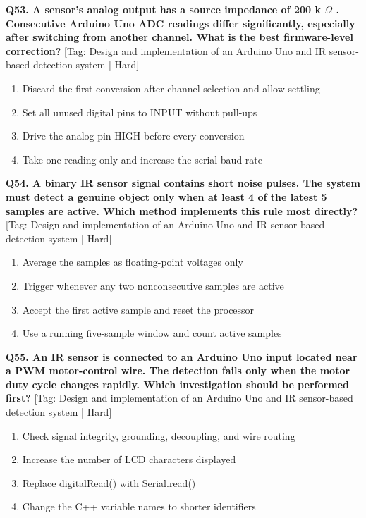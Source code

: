\noindent\textbf{Q53. A sensor's analog output has a source impedance of 200 k $\Omega$ . Consecutive Arduino Uno ADC readings differ significantly, especially after switching from another channel. What is the best firmware-level correction?} \hfill [Tag: Design and implementation of an Arduino Uno and IR sensor-based detection system | Hard]
\begin{enumerate}[label=(\alph*),topsep=2pt,itemsep=1pt,partopsep=0pt,parsep=0pt]
    \item {Discard the first conversion after channel selection and allow settling}
    \item {Set all unused digital pins to INPUT without pull-ups}
    \item {Drive the analog pin HIGH before every conversion}
    \item {Take one reading only and increase the serial baud rate}
\end{enumerate}
\vspace{2mm}

\noindent\textbf{Q54. A binary IR sensor signal contains short noise pulses. The system must detect a genuine object only when at least 4 of the latest 5 samples are active. Which method implements this rule most directly?} \hfill [Tag: Design and implementation of an Arduino Uno and IR sensor-based detection system | Hard]
\begin{enumerate}[label=(\alph*),topsep=2pt,itemsep=1pt,partopsep=0pt,parsep=0pt]
    \item {Average the samples as floating-point voltages only}
    \item {Trigger whenever any two nonconsecutive samples are active}
    \item {Accept the first active sample and reset the processor}
    \item {Use a running five-sample window and count active samples}
\end{enumerate}
\vspace{2mm}

\noindent\textbf{Q55. An IR sensor is connected to an Arduino Uno input located near a PWM motor-control wire. The detection fails only when the motor duty cycle changes rapidly. Which investigation should be performed first?} \hfill [Tag: Design and implementation of an Arduino Uno and IR sensor-based detection system | Hard]
\begin{enumerate}[label=(\alph*),topsep=2pt,itemsep=1pt,partopsep=0pt,parsep=0pt]
    \item {Check signal integrity, grounding, decoupling, and wire routing}
    \item {Increase the number of LCD characters displayed}
    \item {Replace digitalRead() with Serial.read()}
    \item {Change the C++ variable names to shorter identifiers}
\end{enumerate}
\vspace{2mm}

